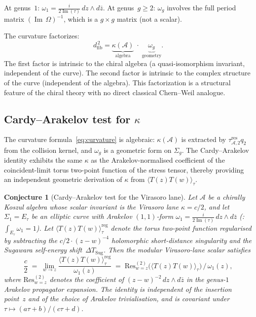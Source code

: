 \documentclass[11pt,reqno]{amsart}
\newtheorem{conjecture}[theorem]{Conjecture}
\theoremstyle{definition}
\theoremstyle{remark}
\newcommand{\cA}{\mathcal{A}}
\newcommand{\Res}{\mathrm{Res}}
\newcommand{\dfib}{d_{\mathrm{fib}}}
\providecommand{\reg}{\mathrm{reg}}
\DeclareMathOperator{\im}{Im}
\numberwithin{equation}{section}
\begin{document}
At genus~$1$:
$\omega_1 = \frac{i}{2\im(\tau)}\,dz\wedge d\bar z$.
At genus~$g \ge 2$:
$\omega_g$ involves the full period matrix
$(\im\,\Omega)^{-1}$, which is a $g \times g$ matrix
(not a scalar).

The curvature factorizes:
\[
\dfib^{\,2} = \underbrace{\kappa(\cA)}_{\text{algebra}}
\;\cdot\;
\underbrace{\omega_g}_{\text{geometry}}.
\]
The first factor is intrinsic to the chiral algebra
(a quasi-isomorphism invariant, independent of the curve).
The second factor is intrinsic to the complex structure of
the curve (independent of the algebra). This factorization
is a structural feature of the chiral theory with no direct
classical Chern--Weil analogue.

\subsection{Cardy--Arakelov test for \texorpdfstring{$\kappa$}{kappa}}
\label{subsec:cardy-arakelov}

The curvature formula~\eqref{eq:curvature} is algebraic: $\kappa(\cA)$
is extracted by $\tau_{\cA,2}^{\mathrm{res}}q_2$ from the collision
kernel, and $\omega_g$
is a geometric form on $\Sigma_g$. The Cardy--Arakelov identity
exhibits the same $\kappa$ as the Arakelov-normalised coefficient of
the coincident-limit torus two-point function of the stress tensor,
thereby providing an independent geometric derivation of $\kappa$
from $\langle T(z)T(w)\rangle_{\tau}$.

\begin{conjecture}[Cardy--Arakelov test for the Virasoro lane]
\label{thm:cardy-arakelov-kappa}
Let $\cA$ be a chirally Koszul algebra whose scalar invariant is the
Virasoro lane $\kappa=c/2$, and let $\Sigma_1 = E_\tau$ be an elliptic curve
with Arakelov $(1,1)$-form
$\omega_1 = \tfrac{i}{2\im(\tau)}\,dz\wedge d\bar z$
\textup{(}\textup{}: $\int_{E_\tau}\omega_1 = 1$\textup{)}. Let
$\langle T(z)T(w)\rangle_\tau^{\reg}$ denote the torus two-point
function regularised by subtracting the $c/2\cdot(z-w)^{-4}$
holomorphic short-distance singularity and the Sugawara
self-energy shift~$\Delta T_{\mathrm{Sug}}$. Then the modular
Virasoro-lane scalar satisfies
\begin{equation}\label{eq:cardy-arakelov}
\frac{c}{2}
\;=\;
\lim_{w\to z}
\frac{\langle T(z)T(w)\rangle_\tau^{\reg}}{\omega_1(z)}
\;=\;
\Res^{(2)}_{w=z}\!\bigl(\langle T(z)T(w)\rangle_\tau\bigr)
\,/\,\omega_1(z),
\end{equation}
where $\Res^{(2)}_{w=z}$ denotes the coefficient of
$(z-w)^{-2}\,dz\wedge d\bar z$ in the genus-$1$ Arakelov
propagator expansion. The identity is independent of the
insertion point~$z$ and of the choice of Arakelov
trivialisation, and is covariant under
$\tau\mapsto(a\tau+b)/(c\tau+d)$.
\end{conjecture}
\end{document}
